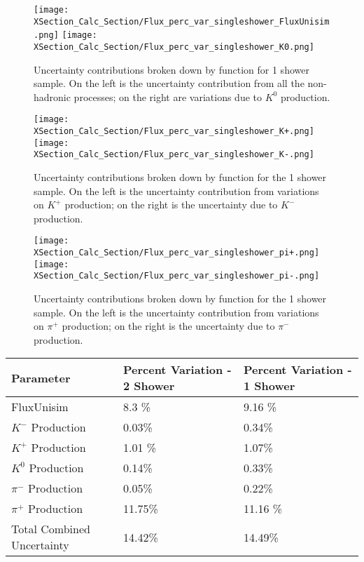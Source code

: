 \begin{figure}[H]
\centering
\texttt{[image: XSection\_Calc\_Section/Flux\_perc\_var\_singleshower\_FluxUnisim.png]}
\texttt{[image: XSection\_Calc\_Section/Flux\_perc\_var\_singleshower\_K0.png]}
\caption{ Uncertainty contributions broken down by function for 1 shower sample. On the left is the uncertainty contribution from all the non-hadronic processes; on the right are variations due to $K^0$ production. }
\label{fig:flux_1shower_unc_plots_0}
\end{figure}

\begin{figure}[H]
\centering
\texttt{[image: XSection\_Calc\_Section/Flux\_perc\_var\_singleshower\_K+.png]}
\texttt{[image: XSection\_Calc\_Section/Flux\_perc\_var\_singleshower\_K-.png]}
\caption{ Uncertainty contributions broken down by function for the 1 shower sample. On the left is the uncertainty contribution from variations on $K^+$ production; on the right is the uncertainty due to $K^-$ production. }
\label{fig:flux_1shower_unc_plots_1}
\end{figure}

\begin{figure}[H]
\centering
\texttt{[image: XSection\_Calc\_Section/Flux\_perc\_var\_singleshower\_pi+.png]}
\texttt{[image: XSection\_Calc\_Section/Flux\_perc\_var\_singleshower\_pi-.png]}
\caption{ Uncertainty contributions broken down by function for the 1 shower sample. On the left is the uncertainty contribution from variations on $\pi^+$ production; on the right is the uncertainty due to $\pi^-$ production. }
\label{fig:flux_1shower_unc_plots_2}
\end{figure}

 \begin{table}[H]
 \centering
  \begin{tabular}{| l | l | l |}
  \hline
   Parameter & Percent Variation - 2 Shower & Percent Variation - 1 Shower  \\ [0.1ex] \hline
 FluxUnisim & 8.3 \% & 9.16 \%  \\
 $K^-$ Production & 0.03\% & 0.34\%\\
 $K^+$ Production &  1.01 \% & 1.07\% \\
 $K^0$ Production & 0.14\% & 0.33\% \\
 $\pi^-$ Production & 0.05\% & 0.22\%\\
 $\pi^+$ Production &  11.75\% & 11.16 \% \\ \hline
 Total Combined Uncertainty & 14.42\% & 14.49\%\\ \hline
\end{tabular}
\end{table}


